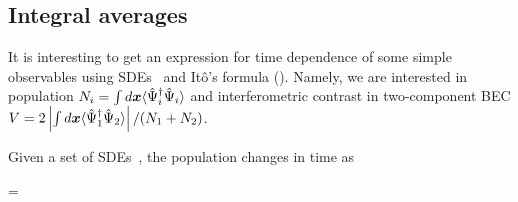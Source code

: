 \subsection{Integral averages}

It is interesting to get an expression for time dependence of some simple observables using SDEs~ and It\^{o}'s formula ().
Namely, we are interested in population $N_i = \int d\boldsymbol{x} \langle \hat{\Psi}_i^\dagger \hat{\Psi}_i \rangle$ and interferometric contrast in two-component BEC $V = 2 \left| \int d\boldsymbol{x} \langle \hat{\Psi}_1^\dagger \hat{\Psi}_2 \rangle \right| / (N_1 + N_2)$.

\begin{theorem}
	Given a set of SDEs~, the population changes in time as
	\begin{eqn*}
		=
	\end{eqn*}
\end{theorem}
